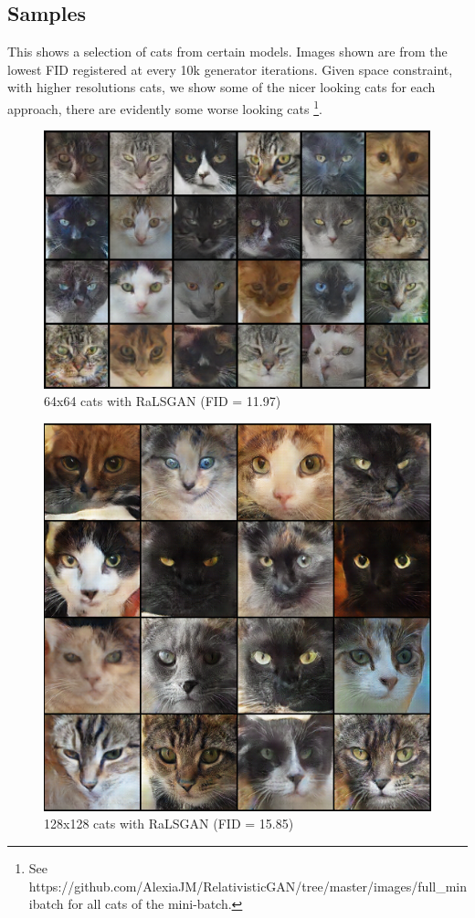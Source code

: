 \documentclass{article}
\begin{document}
\subsection{Samples}

This shows a selection of cats from certain models. Images shown are from the lowest FID registered at every 10k generator iterations. Given space constraint, with higher resolutions cats, we show some of the nicer looking cats for each approach, there are evidently some worse looking cats \footnote{See https://github.com/AlexiaJM/RelativisticGAN/tree/master/images/full\_minibatch for all cats of the mini-batch.}.

\begin{figure}[H]
	\centering
	\includegraphics[width=390pt]{best_64x64_crop.png}
	\caption{64x64 cats with RaLSGAN (FID = 11.97)}
\end{figure}

\begin{figure}[H]
	\centering
	\includegraphics[width=390pt]{best_128x128_crop.png}
	\caption{128x128 cats with RaLSGAN (FID = 15.85)}
\end{figure}
\end{document}
